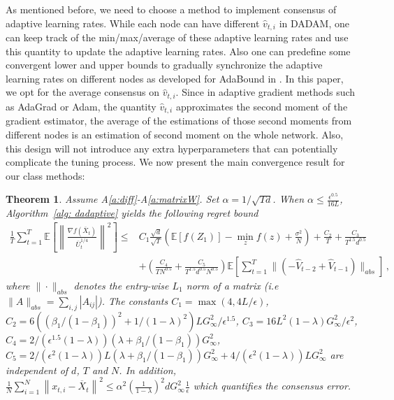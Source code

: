 \documentclass{article} %
\newtheorem{theorem}{Theorem}
\begin{document}
As mentioned before, we need to choose a method to implement consensus of adaptive learning rates.
While each node can have different $\hat v_{t,i}$ in DADAM, one can keep track of the min/max/average of these adaptive learning rates and use this quantity to update the adaptive learning rates. 
Also one can predefine some convergent lower and upper bounds to gradually synchronize the adaptive learning rates on different nodes as developed for AdaBound in \citep{luo2019adaptive}.  
In this paper, we opt for the average consensus on $\hat v_{t,i}$.
Since in adaptive gradient methods such as AdaGrad or Adam, the quantity $\hat v_{t,i}$ approximates the second moment of the gradient estimator, the average of the estimations of those second moments from different nodes is an estimation of second moment on the whole network.  
Also, this design will not introduce any extra hyperparameters that can potentially complicate the tuning process. We now present the main convergence result for our class methods:
\begin{theorem}\label{thm: dagm_converge}
Assume A\ref{a:diff}-A\ref{a:matrixW}.
Set $\alpha = 1/
	\sqrt{Td}$. When $\alpha  \leq \frac{\epsilon^{0.5}}{16L} $, 
	  Algorithm~\ref{alg: dadaptive} yields the following regret bound
	{\small 
	\begin{align}\label{eq: thm1}
	 \frac{1}{T}\sum_{t=1}^T  \mathbb E \left [\left\|\frac{\nabla f( \overline X_{t})}{\overline U_{t}^{1/4}}\right\|^2  \right] 
	\leq  & C_1 \frac{\sqrt{d}}{\sqrt{T}} \left(\mathbb E  [f( Z_{1})]  - \min_{z} f(z)  + \frac{\sigma^2}{N}\right)  +  \frac{ C_2 }{T}    + \frac{C_3}{T^{1.5}d^{0.5}}  \nonumber \\ 
	&+ \left(  \frac{C_4}{T N^{0.5} }  + \frac{C_5}{T^{1.5}d^{0.5} N^{0.5}}   \right) \mathbb E \left[ \sum_{t=1}^{T}   \|    (- \hat V_{t-2} + \hat V_{t-1} ) \|_{abs} \right]  \, ,
	\end{align}
	}
where $\| \cdot\|_{abs}$  denotes the entry-wise $L_1$ norm of a matrix (i.e $\| A\|_{abs} = \sum_{i,j}{|A_{ij}|}$). The constants $C_1 =  \max (4, 4{L/\epsilon})$,
	$C_2 =  6 (( \beta_1/(1-\beta_1))^2 + 1/(1-\lambda)^2 )L  G_{\infty}^2 /\epsilon^{1.5}$,
	$C_3 =  16L^2  (1-\lambda) G_{\infty}^2/\epsilon^2$,
	$C_4 =   2/ (\epsilon^{1.5}(1-\lambda)) (     \lambda + \beta_1/(1-\beta_1)) G_{\infty}^2$,
	$C_5 =   2/ (\epsilon^{2}(1-\lambda))   L  (\lambda + \beta_1/(1-\beta_1)) G_{\infty}^2  + 4/ (\epsilon^{2}(1-\lambda))   L    G_{\infty}^2$ are independent of $d$, $T$ and $N$. In addition, $\frac{1}{N}\sum_{i=1}^N\left\| {  x_{t,i} -   \overline X_{t}}  \right\|^2   \leq \alpha^2 \left (\frac{1}{1-\lambda} \right)^2 d G_{\infty}^2 \frac{1}{\epsilon}$ which quantifies the consensus error.
\end{theorem}
\end{document}
